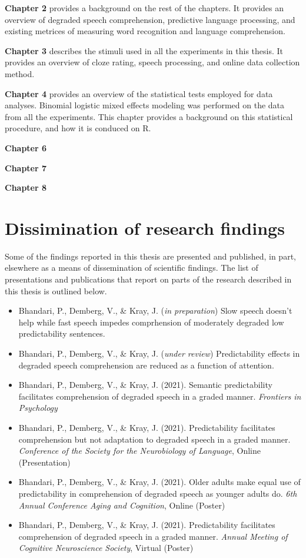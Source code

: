 \documentclass[a4paper, nobind]{templates/ociamthesis}
\begin{document}
\textbf{Chapter 2} provides a background on the rest of the chapters.
It provides an overview of degraded speech comprehension, predictive language processing, and existing metrices of measuring word recognition and language comprehension.

\textbf{Chapter 3} describes the stimuli used in all the experiments in this thesis.
It provides an overview of cloze rating, speech processing, and online data collection method.

\textbf{Chapter 4} provides an overview of the statistical tests employed for data analyses.
Binomial logistic mixed effects modeling was performed on the data from all the experiments.
This chapter provides a background on this statistical procedure,
and how it is conduced on R.

\textbf{Chapter 6}

\textbf{Chapter 7}

\textbf{Chapter 8}

\hypertarget{dissimination-of-research-findings}{%
\section{Dissimination of research findings}\label{dissimination-of-research-findings}}

Some of the findings reported in this thesis are presented and published, in part, elsewhere as a means of dissemination of scientific findings.
The list of presentations and publications that report on parts of the research described in this thesis is outlined below.

\begin{itemize}
\item
  Bhandari, P., Demberg, V., \& Kray, J. (\emph{in preparation}) Slow speech doesn't help while fast speech impedes comprhension of moderately degraded low predictability sentences.
\item
  Bhandari, P., Demberg, V., \& Kray, J. (\emph{under review}) Predictability effects in degraded speech comprehension are reduced as a function of attention.
\item
  Bhandari, P., Demberg, V., \& Kray, J. (2021). Semantic predictability facilitates comprehension of degraded speech in a graded manner. \emph{Frontiers in Psychology}
\item
  Bhandari, P., Demberg, V., \& Kray, J. (2021). Predictability facilitates comprehension but not adaptation to degraded speech in a graded manner. \emph{Conference of the Society for the Neurobiology of Language}, Online (Presentation)
\item
  Bhandari, P., Demberg, V., \& Kray, J. (2021). Older adults make equal use of predictability in comprehension of degraded speech as younger adults do. \emph{6th Annual Conference Aging and Cognition}, Online (Poster)
\item
  Bhandari, P., Demberg, V., \& Kray, J. (2021). Predictability facilitates comprehension of degraded speech in a graded manner. \emph{Annual Meeting of Cognitive Neuroscience Society}, Virtual (Poster)
\end{itemize}
\end{document}
